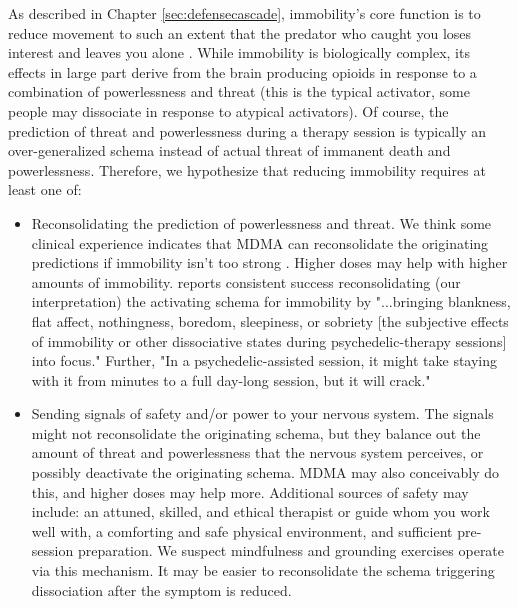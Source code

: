 \documentclass[12pt,letterpaper]{book}
\begin{document}
As described in Chapter \ref{sec:defensecascade}, immobility's core function is to reduce movement to such an extent that the predator who caught you loses interest and leaves you alone \cite{kozlowskaDefenseCascade}. While immobility is biologically complex, its effects in large part derive from the brain producing opioids in response to a combination of powerlessness and threat (this is the typical activator, some people may dissociate in response to atypical activators). Of course, the prediction of threat and powerlessness during a therapy session is typically an over-generalized schema instead of actual threat of immanent death and powerlessness. Therefore, we hypothesize that reducing immobility requires at least one of:
\begin{itemize}
	\item Reconsolidating the prediction of powerlessness and threat. We think some clinical experience indicates that MDMA can reconsolidate the originating predictions if immobility isn't too strong \cite{razviPSIP}. Higher doses may help with higher amounts of immobility. \textcite{razviPSIP} reports consistent success reconsolidating (our interpretation) the activating schema for immobility by "...bringing blankness, flat affect, nothingness, boredom, sleepiness, or sobriety [the subjective effects of immobility or other dissociative states during psychedelic-therapy sessions] into focus." Further, "In a psychedelic-assisted session, it might take staying with it from minutes to a full day-long session, but it will crack." 
	\item Sending signals of safety and/or power to your nervous system. The signals might not reconsolidate the originating schema, but they balance out the amount of threat and powerlessness that the nervous system perceives, or possibly deactivate the originating schema. MDMA may also conceivably do this, and higher doses may help more. Additional sources of safety may include: an attuned, skilled, and ethical therapist or guide whom you work well with, a comforting and safe physical environment, and sufficient pre-session preparation. We suspect mindfulness and grounding exercises operate via this mechanism.  It may be easier to reconsolidate the schema triggering dissociation after the symptom is reduced.

\end{itemize}
\end{document}
